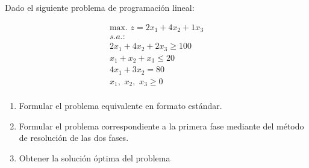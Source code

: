 Dado el siguiente problema de programación lineal:

\begin{equation}
\begin{split}
\mbox{max. } z = 2x_1 + 4x_2 + 1x_3\\
s.a.:\\
2x_1 + 4x_2 + 2x_3 \geq 100\\
 x_1 +  x_2 +  x_3 \leq 20\\
4x_1 + 3x_2         = 80\\
x_1,\,\,x_2,\,\,x_3\geq 0\\
\end{split}
\end{equation}

\begin{enumerate}
    \item Formular el problema equivalente en formato estándar.

    \item Formular el problema correspondiente a la primera fase mediante del método de resolución de las dos fases.

    \item Obtener la solución óptima del problema

\end{enumerate}

